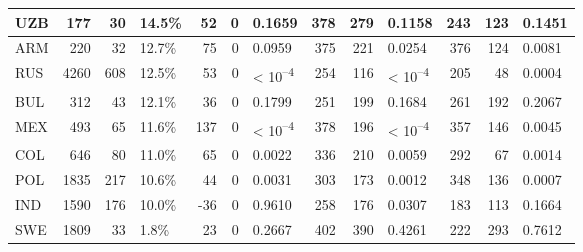 \begin{tabular}{l|r|r|l|r|r|l|r|r|l|r|r|l}
\hline
UZB & 177 & 30 & 14.5\% & 52 & 0 & 0.1659 & 378 & 279 & 0.1158 & 243 & 123 & 0.1451\\
\hline
ARM & 220 & 32 & 12.7\% & 75 & 0 & 0.0959 & 375 & 221 & 0.0254 & 376 & 124 & 0.0081\\
\hline
RUS & 4260 & 608 & 12.5\% & 53 & 0 & < 10\textsuperscript{--4} & 254 & 116 & < 10\textsuperscript{--4} & 205 & 48 & 0.0004\\
\hline
BUL & 312 & 43 & 12.1\% & 36 & 0 & 0.1799 & 251 & 199 & 0.1684 & 261 & 192 & 0.2067\\
\hline
MEX & 493 & 65 & 11.6\% & 137 & 0 & < 10\textsuperscript{--4} & 378 & 196 & < 10\textsuperscript{--4} & 357 & 146 & 0.0045\\
\hline
COL & 646 & 80 & 11.0\% & 65 & 0 & 0.0022 & 336 & 210 & 0.0059 & 292 & 67 & 0.0014\\
\hline
POL & 1835 & 217 & 10.6\% & 44 & 0 & 0.0031 & 303 & 173 & 0.0012 & 348 & 136 & 0.0007\\
\hline
IND & 1590 & 176 & 10.0\% & -36 & 0 & 0.9610 & 258 & 176 & 0.0307 & 183 & 113 & 0.1664\\
\hline
SWE & 1809 & 33 & 1.8\% & 23 & 0 & 0.2667 & 402 & 390 & 0.4261 & 222 & 293 & 0.7612\\
\hline
\end{tabular}
